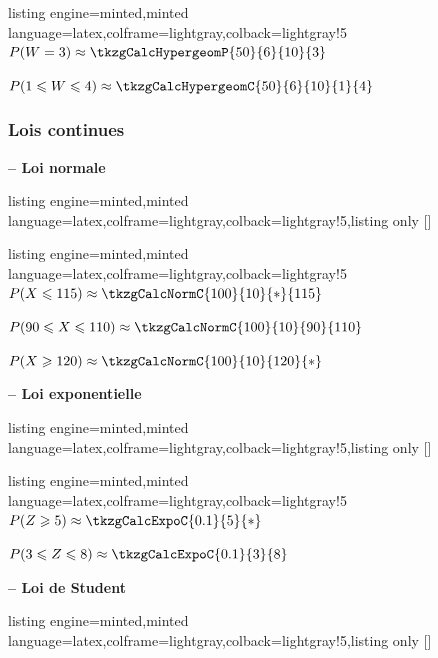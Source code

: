 \documentclass[11pt,a4paper]{ltxdoc}
\begin{document}
\begin{tcblisting}{listing engine=minted,minted language=latex,colframe=lightgray,colback=lightgray!5}
$P(W=3) \approx \tkzgCalcHypergeomP{50}{6}{10}{3}$

$P(1 \leqslant W \leqslant 4) \approx \tkzgCalcHypergeomC{50}{6}{10}{1}{4}$
\end{tcblisting}

\subsubsection{Lois continues}

\textbf{-- Loi normale}

\begin{tcblisting}{listing engine=minted,minted language=latex,colframe=lightgray,colback=lightgray!5,listing only}
[\macro]
\end{tcblisting}

\begin{tcblisting}{listing engine=minted,minted language=latex,colframe=lightgray,colback=lightgray!5}
$P(X \leqslant 115) \approx \tkzgCalcNormC{100}{10}{*}{115}$

$P(90 \leqslant X \leqslant 110) \approx \tkzgCalcNormC{100}{10}{90}{110}$

$P(X \geqslant 120) \approx \tkzgCalcNormC{100}{10}{120}{*}$
\end{tcblisting}

\textbf{-- Loi exponentielle}

\begin{tcblisting}{listing engine=minted,minted language=latex,colframe=lightgray,colback=lightgray!5,listing only}
[\macro]
\end{tcblisting}

\begin{tcblisting}{listing engine=minted,minted language=latex,colframe=lightgray,colback=lightgray!5}
$P(Z \geqslant 5) \approx \tkzgCalcExpoC{0.1}{5}{*}$

$P(3 \leqslant Z \leqslant 8) \approx \tkzgCalcExpoC{0.1}{3}{8}$
\end{tcblisting}

\textbf{-- Loi de Student}

\begin{tcblisting}{listing engine=minted,minted language=latex,colframe=lightgray,colback=lightgray!5,listing only}
[\macro]
\end{tcblisting}
\end{document}
